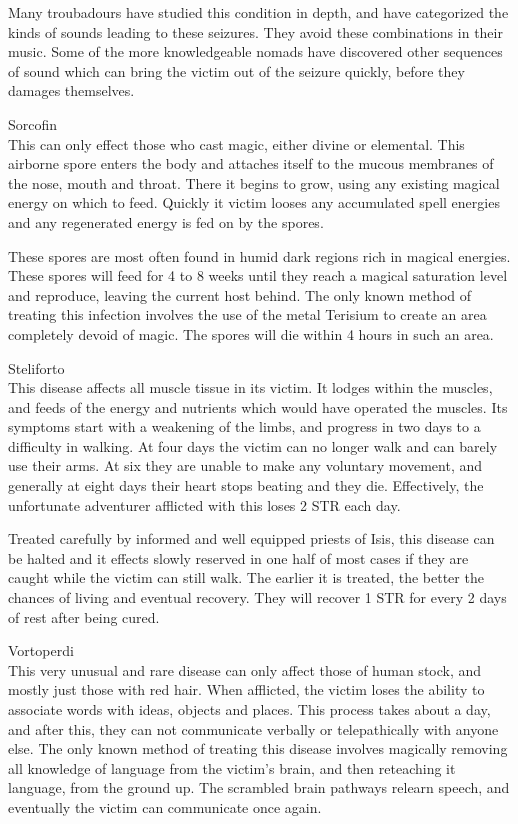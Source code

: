 Many troubadours have studied this condition in depth, and have categorized the kinds of sounds leading to these seizures. They avoid these combinations in their music. Some of the more knowledgeable nomads have discovered other sequences of sound which can bring the victim out of the seizure quickly, before they damages themselves.

Sorcofin\\
This can only effect those who cast magic, either divine or elemental. This airborne spore enters the body and attaches itself to the mucous membranes of the nose, mouth and throat. There it begins to grow, using any existing magical energy on which to feed. Quickly it victim looses any accumulated spell energies and any regenerated energy is fed on by the spores.

These spores are most often found in humid dark regions rich in magical energies. These spores will feed for 4 to 8 weeks until they reach a magical saturation level and reproduce, leaving the current host behind. The only known method of treating this infection involves the use of the metal Terisium to create an area completely devoid of magic. The spores will die within 4 hours in such an area.

Steliforto\\
This disease affects all muscle tissue in its victim. It lodges within the muscles, and feeds of the energy and nutrients which would have operated the muscles. Its symptoms start with a weakening of the limbs, and progress in two days to a difficulty in walking. At four days the victim can no longer walk and can barely use their arms. At six they are unable to make any voluntary movement, and generally at eight days their heart stops beating and they die. Effectively, the unfortunate adventurer afflicted with this loses 2 STR each day.

Treated carefully by informed and well equipped priests of Isis, this disease can be halted and it effects slowly reserved in one half of most cases if they are caught while the victim can still walk. The earlier it is treated, the better the chances of living and eventual recovery. They will recover 1 STR for every 2 days of rest after being cured.

Vortoperdi\\
This very unusual and rare disease can only affect those of human stock, and mostly just those with red hair. When afflicted, the victim loses the ability to associate words with ideas, objects and places. This process takes about a day, and after this, they can not communicate verbally or telepathically with anyone else. The only known method of treating this disease involves magically removing all knowledge of language from the victim's brain, and then reteaching it language, from the ground up. The scrambled brain pathways relearn speech, and eventually the victim can communicate once again.
